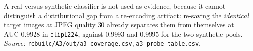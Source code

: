 A real-versus-synthetic classifier is not used as evidence, because it cannot distinguish a
distributional gap from a re-encoding artifact: re-saving the \emph{identical} target images at
JPEG quality $30$ already separates them from themselves at AUC $0.9928$ in \texttt{clipL224}, against
$0.9993$ and $0.9995$ for the two synthetic pools. \emph{Source:} \texttt{rebuild/A3/out/a3\_coverage.csv},
\texttt{a3\_probe\_table.csv}.
